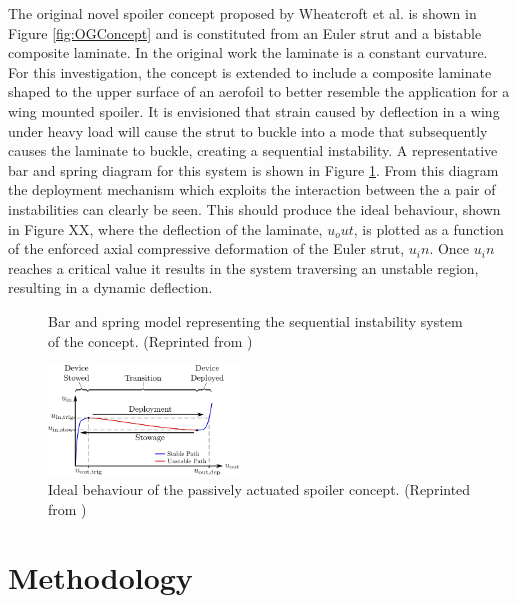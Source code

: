 \documentclass{IEEEtran}
\begin{document}
		The original novel spoiler concept proposed by Wheatcroft et al. is shown in Figure \ref{fig:OGConcept} and is constituted from an Euler strut and a bistable composite laminate. In the original work the laminate is a constant curvature. For this investigation, the concept is extended to include a composite laminate shaped to the upper surface of an aerofoil to better resemble the application for a wing mounted spoiler. It is envisioned that strain caused by deflection in a wing under heavy load will cause the strut to buckle into a mode that subsequently causes the laminate to buckle, creating a sequential instability. A representative bar and spring diagram for this system is shown in Figure \ref{fig:BarNSpring}. From this diagram the deployment mechanism which exploits the  interaction between the a pair of instabilities can clearly be seen. This should produce the ideal behaviour, shown in Figure XX, where the deflection of the laminate, $u_out$, is plotted as a function of the enforced axial compressive deformation of the Euler strut, $u_in$. Once $u_in$  reaches a critical value it results in the system traversing an unstable region, resulting in a dynamic deflection.

		\begin{figure}[!h]
			\centering
			
			\caption{Bar and spring model representing the sequential instability system of the concept. (Reprinted from \cite{Wheatcroft_2023})}
			\label{fig:BarNSpring}
		\end{figure}
	
		\begin{figure}[!h]
			\centering
			\includegraphics[width=0.45\textwidth]{IntroductionImages/Desired_Path_V4.png}
			\caption{Ideal behaviour of the passively actuated spoiler concept. (Reprinted from \cite{Wheatcroft_2023})}
			\label{fig:DesiredPath}
		\end{figure}
	
		
	\section{Methodology}
		
\end{document}
